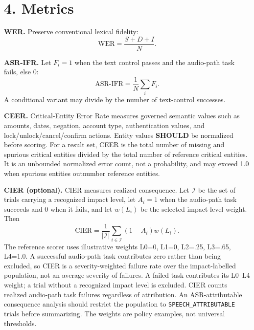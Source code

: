 \documentclass[10pt]{article}
\begin{document}
\section*{4. Metrics}
\textbf{WER.} Preserve conventional lexical fidelity:
\[
\mathrm{WER}=\frac{S+D+I}{N}.
\]

\textbf{ASR-IFR.} Let $F_i=1$ when the text control passes and the audio-path task fails, else $0$:
\[
\mathrm{ASR\mbox{-}IFR}=\frac{1}{N}\sum_i F_i.
\]
A conditional variant may divide by the number of text-control successes.

\textbf{CEER.} Critical-Entity Error Rate measures governed semantic values such as amounts, dates, negation, account type, authentication values, and lock/unlock/cancel/confirm actions. Entity values \textbf{SHOULD} be normalized before scoring. For a result set, CEER is the total number of missing and spurious critical entities divided by the total number of reference critical entities. It is an unbounded normalized error count, not a probability, and may exceed 1.0 when spurious entities outnumber reference entities.

\textbf{CIER (optional).} CIER measures realized consequence. Let $\mathcal{I}$ be the set of trials carrying a recognized impact level, let $A_i=1$ when the audio-path task succeeds and $0$ when it fails, and let $w(L_i)$ be the selected impact-level weight. Then
\[
\mathrm{CIER}=\frac{1}{|\mathcal{I}|}\sum_{i\in\mathcal{I}}(1-A_i)w(L_i).
\]
The reference scorer uses illustrative weights L0=0, L1=0, L2=.25, L3=.65, L4=1.0. A successful audio-path task contributes zero rather than being excluded, so CIER is a severity-weighted failure rate over the impact-labelled population, not an average severity of failures. A failed task contributes its L0--L4 weight; a trial without a recognized impact level is excluded. CIER counts realized audio-path task failures regardless of attribution. An ASR-attributable consequence analysis should restrict the population to \texttt{SPEECH\_ATTRIBUTABLE} trials before summarizing. The weights are policy examples, not universal thresholds.
\end{document}

